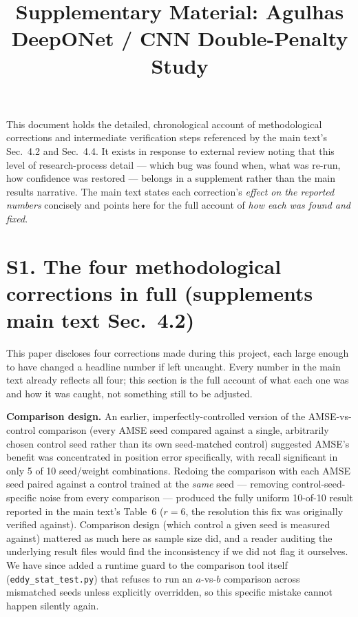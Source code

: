 \documentclass[11pt]{article}
\title{Supplementary Material: Agulhas DeepONet / CNN Double-Penalty Study}
\author{}
\date{}
\begin{document}
\maketitle

This document holds the detailed, chronological account of methodological corrections and intermediate verification steps referenced by the main text's Sec.~4.2 and Sec.~4.4. It exists in response to external review noting that this level of research-process detail --- which bug was found when, what was re-run, how confidence was restored --- belongs in a supplement rather than the main results narrative. The main text states each correction's \textit{effect on the reported numbers} concisely and points here for the full account of \textit{how each was found and fixed}.

\section*{S1. The four methodological corrections in full (supplements main text Sec.~4.2)}

This paper discloses four corrections made during this project, each large enough to have changed a headline number if left uncaught. Every number in the main text already reflects all four; this section is the full account of what each one was and how it was caught, not something still to be adjusted.

\textbf{Comparison design.} An earlier, imperfectly-controlled version of the AMSE-vs-control comparison (every AMSE seed compared against a single, arbitrarily chosen control seed rather than its own seed-matched control) suggested AMSE's benefit was concentrated in position error specifically, with recall significant in only 5 of 10 seed/weight combinations. Redoing the comparison with each AMSE seed paired against a control trained at the \textit{same} seed --- removing control-seed-specific noise from every comparison --- produced the fully uniform 10-of-10 result reported in the main text's Table~6 ($r=6$, the resolution this fix was originally verified against). Comparison design (which control a given seed is measured against) mattered as much here as sample size did, and a reader auditing the underlying result files would find the inconsistency if we did not flag it ourselves. We have since added a runtime guard to the comparison tool itself (\texttt{eddy\_stat\_test.py}) that refuses to run an $a$-vs-$b$ comparison across mismatched seeds unless explicitly overridden, so this specific mistake cannot happen silently again.
\end{document}
